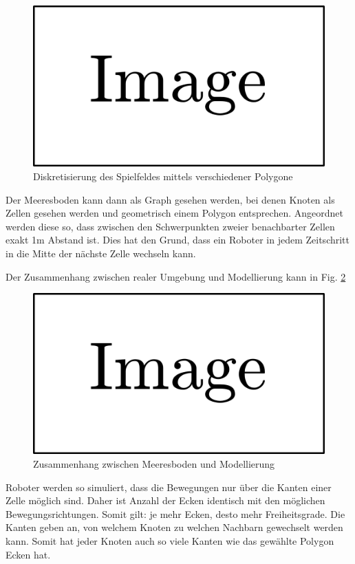 \documentclass{article}
\begin{document}
\begin{figure}
\includegraphics{img/dummy.png}
\caption{Diskretisierung des Spielfeldes mittels verschiedener Polygone}
\label{img:floor_comp_polygons}
\end{figure}

Der Meeresboden kann dann als Graph gesehen werden, bei denen Knoten 
als Zellen gesehen werden und geometrisch einem Polygon entsprechen. 
Angeordnet werden diese so, dass zwischen den Schwerpunkten zweier 
benachbarter Zellen exakt 1m Abstand ist. Dies hat den Grund, dass 
ein Roboter in jedem Zeitschritt in die Mitte der nächste Zelle wechseln kann.

Der Zusammenhang zwischen realer Umgebung und Modellierung kann in
Fig. \ref{img:floor_grap_polygons} 

\begin{figure}
\includegraphics{img/dummy.png}
\caption{Zusammenhang zwischen Meeresboden und Modellierung}
\label{img:floor_grap_polygons}
\end{figure}

Roboter werden so simuliert, dass die Bewegungen nur über die Kanten einer
Zelle möglich sind. Daher ist Anzahl der Ecken identisch mit den möglichen
Bewegungsrichtungen. Somit gilt: je mehr Ecken, desto mehr Freiheitsgrade.
Die Kanten geben an, von welchem Knoten zu welchen Nachbarn gewechselt werden
kann. Somit hat jeder Knoten auch so viele Kanten wie das gewählte Polygon
Ecken hat.
\end{document}
